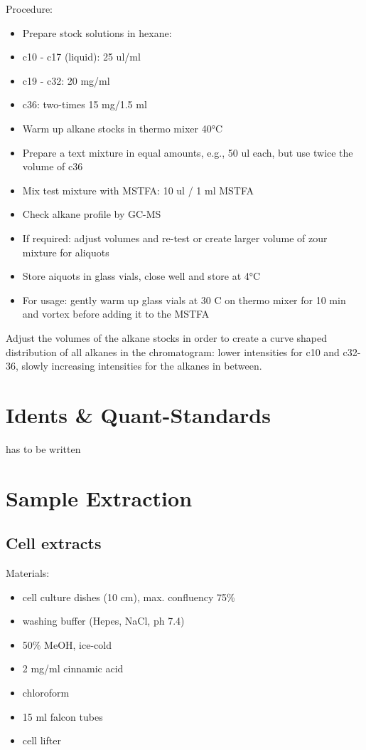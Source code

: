 \documentclass[]{book}
\providecommand{\tightlist}{%
  \setlength{\itemsep}{0pt}\setlength{\parskip}{0pt}}
\theoremstyle{definition}
\theoremstyle{definition}
\theoremstyle{definition}
\theoremstyle{remark}
\begin{document}
Procedure:

\begin{itemize}
\tightlist
\item
  Prepare stock solutions in hexane:
\item
  c10 - c17 (liquid): 25 ul/ml
\item
  c19 - c32: 20 mg/ml
\item
  c36: two-times 15 mg/1.5 ml
\item
  Warm up alkane stocks in thermo mixer 40°C
\item
  Prepare a text mixture in equal amounts, e.g., 50 ul each, but use
  twice the volume of c36
\item
  Mix test mixture with MSTFA: 10 ul / 1 ml MSTFA
\item
  Check alkane profile by GC-MS
\item
  If required: adjust volumes and re-test or create larger volume of
  zour mixture for aliquots
\item
  Store aiquots in glass vials, close well and store at 4°C
\item
  For usage: gently warm up glass vials at 30 C on thermo mixer for 10
  min and vortex before adding it to the MSTFA
\end{itemize}

Adjust the volumes of the alkane stocks in order to create a curve
shaped distribution of all alkanes in the chromatogram: lower
intensities for c10 and c32-36, slowly increasing intensities for the
alkanes in between.

\section{Idents \& Quant-Standards}\label{standards}

has to be written

\section{Sample Extraction}\label{SampleExtraction}

\subsection{Cell extracts}\label{cell-extracts}

Materials:

\begin{itemize}
\tightlist
\item
  cell culture dishes (10 cm), max. confluency 75\%
\item
  washing buffer (Hepes, NaCl, ph 7.4)
\item
  50\% MeOH, ice-cold
\item
  2 mg/ml cinnamic acid
\item
  chloroform
\item
  15 ml falcon tubes
\item
  cell lifter
\end{itemize}
\end{document}
